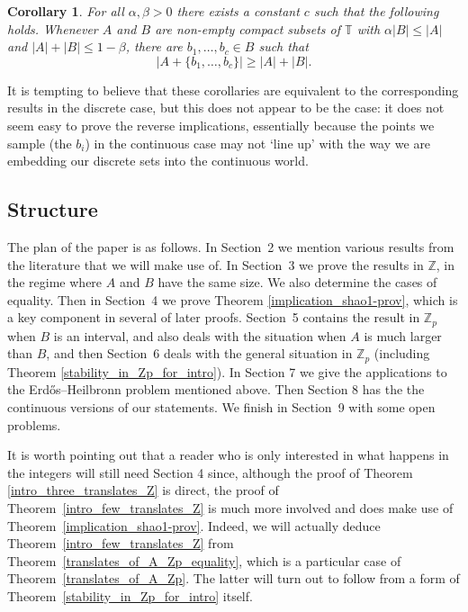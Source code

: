 \documentclass[12pt,reqno]{amsart}
\newtheorem{corollary}[theorem]{Corollary}
\theoremstyle{definition}
\renewcommand\leq{\leqslant}
\renewcommand\geq{\geqslant}
\begin{document}
\begin{corollary}\label{cont_translates_of_A_Zp}
For all $\alpha, \beta >0$ there exists a constant $c$ such that the
following holds. Whenever $A$ and $B$ are non-empty compact subsets of $\mathbb{T}$ with
$\alpha |B| \leq |A|$ and $|A|+|B| \leq 1-\beta$, there
are $b_1, \hdots, b_c \in B$ such that
\[
|A+\{b_1, \hdots, b_c\} |\geq |A|+|B|.
\]
\end{corollary}

It is tempting to believe that
these corollaries are equivalent to the corresponding results in the discrete case, but this does not
appear to be the case: it does not seem easy to prove the reverse implications, essentially because the
points we sample (the $b_i$) in the continuous case may not `line up' with the way we are embedding our
discrete sets into the continuous world.

\vspace{10pt}
\subsection{Structure}
The plan of the paper is as follows. In Section~2 we mention various results from the literature that we
will make use of. In Section~3 we prove
the results in ${\mathbb Z}$, in
the regime where $A$ and $B$ have the same size. We also determine the cases of equality. Then in Section~4 we prove
Theorem \ref{implication_shao1-prov}, which is a key component in several of later proofs. Section~5
contains the
result in ${\mathbb Z}_p$ when $B$ is an interval, and also deals with the situation when $A$ is much larger than $B$, and then Section~6 deals with the
general situation in ${\mathbb Z}_p$ (including Theorem \ref{stability_in_Zp_for_intro}).
In Section 7 we give the applications to the Erd\H{o}s--Heilbronn problem mentioned above. Then Section 8
has the the continuous versions of our statements.
We finish in Section~9 with some open problems.

\vspace{5pt}
It is worth pointing out that a reader
who is only interested in what happens in the integers will still need Section 4 since, although the
proof of Theorem \ref{intro_three_translates_Z} is direct, the proof of Theorem~\ref{intro_few_translates_Z}
is much more involved and does make use of
Theorem~\ref{implication_shao1-prov}. Indeed, we will actually deduce
Theorem~\ref{intro_few_translates_Z} from Theorem~\ref{translates_of_A_Zp_equality}, which is a particular case of Theorem~\ref{translates_of_A_Zp}. The latter will turn out to follow from a form of
Theorem~\ref{stability_in_Zp_for_intro} itself.
\end{document}
